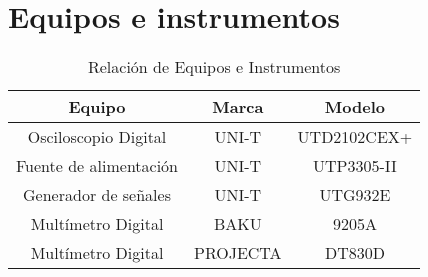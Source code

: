 
\section{Equipos e instrumentos}

\begin{table}[H]
    \centering
    \begin{tabular}{|c|c|c|}
        \hline
        \textbf{Equipo} & \textbf{Marca} & \textbf{Modelo} \\\hline
        Osciloscopio Digital & UNI-T & UTD2102CEX+ \\\hline
        Fuente de alimentación & UNI-T & UTP3305-II \\\hline
        Generador de señales & UNI-T & UTG932E \\\hline
        Multímetro Digital & BAKU & 9205A \\\hline
        Multímetro Digital & PROJECTA & DT830D \\\hline
    \end{tabular}    
    \caption{Relación de Equipos e Instrumentos}
    \label{tab:equipos}
\end{table}
